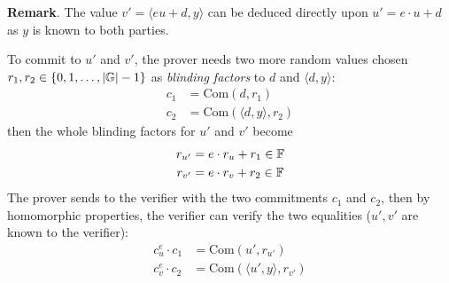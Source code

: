 \documentclass{article}
\begin{document}
\textbf{Remark}. The value $v' = \langle e u + d, y \rangle$ can be deduced directly upon $u' = e \cdot u + d$ as $y$ is known to both parties. 

To commit to $u'$ and $v'$, the prover needs two more random values chosen $r_1, r_2 \in \left\{ 0, 1, \dots, \abs{\mathbb{G}}-1 \right\}$ as \textit{blinding factors} to $d$ and $\langle d, y \rangle$:
\begin{equation*}
\begin{split}
c_1 & = \text{Com}(d, r_1) \\
c_2 & = \text{Com}(\langle d, y \rangle, r_2)
\end{split}
\end{equation*}
then the whole blinding factors for $u'$ and $v'$ become
\begin{equation} \label{eq:vector-commitment-equations}
\begin{split}
r_{u'} & = e \cdot r_u + r_1 \in \mathbb{F} \\
r_{v'} & = e \cdot r_{v} + r_2 \in \mathbb{F} 
\end{split}
\end{equation}
The prover sends to the verifier with the two commitments $c_1$ and $c_2$, then by homomorphic properties, the verifier can verify the two equalities ($u', v'$ are known to the verifier):
\begin{equation*}
\begin{split}
c_u^e \cdot c_1 & = \text{Com}(u', r_{u'}) \\
c_v^e \cdot c_2 & = \text{Com}(\langle u', y \rangle, r_{v'})
\end{split}
\end{equation*}
\end{document}
